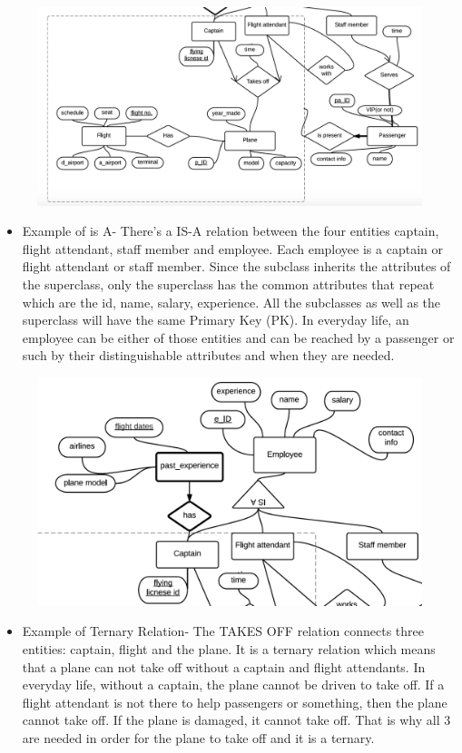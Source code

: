 \documentclass[10pt,conference]{IEEEtran}
\begin{document}
\begin{figure}
\centering
\includegraphics[width=.50\textwidth]{Aggregation.png}
\end{figure}

\vspace{50mm}

\newpage\begin{itemize} \item{
Example of is A- There's a IS-A relation between the four entities captain, flight attendant, staff member and employee. Each employee is a captain or flight attendant or staff member.
Since the subclass inherits the attributes of the superclass, only the superclass has the common attributes that repeat which are the id, name, salary, experience. All the subclasses as well as the superclass will have the same Primary Key (PK). In everyday life, an employee can be either of those entities and can be reached by a passenger or such by their distinguishable attributes and when they are needed.
} \end{itemize} 

\begin{figure}
\centering
\includegraphics[width=.50\textwidth]{is_a.png}
\end{figure}


\newpage\begin{itemize} \item{
Example of Ternary Relation- The TAKES OFF relation connects three entities: captain, flight and the plane. It is a ternary relation which means that a plane can not take off without a captain and flight attendants.  In everyday life, without a captain, the plane cannot be driven to take off. If a flight attendant is not there to help passengers or something, then the plane cannot take off. If the plane is damaged, it cannot take off. That is why all 3 are needed in order for the plane to take off and it is a ternary.} \end{itemize}
\end{document}
